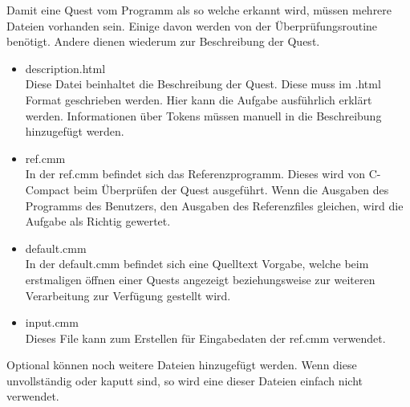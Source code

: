 Damit eine Quest vom Programm als so welche erkannt wird, müssen mehrere Dateien vorhanden sein. Einige davon werden von der Überprüfungsroutine benötigt. Andere dienen wiederum zur Beschreibung der Quest.

\begin{itemize}
\item description.html\\
Diese Datei beinhaltet die Beschreibung der Quest. Diese muss im .html Format geschrieben werden. Hier kann die Aufgabe ausführlich erklärt werden. Informationen über Tokens müssen manuell in die Beschreibung hinzugefügt werden.

\item ref.cmm\\
In der ref.cmm befindet sich das Referenzprogramm. Dieses wird von C-Compact beim Überprüfen der Quest ausgeführt. Wenn die Ausgaben des Programms des Benutzers, den Ausgaben des Referenzfiles gleichen, wird die Aufgabe als Richtig gewertet.

\item default.cmm\\
In der default.cmm befindet sich eine Quelltext Vorgabe, welche beim erstmaligen öffnen einer Quests angezeigt beziehungsweise zur weiteren Verarbeitung zur Verfügung gestellt wird.

\item input.cmm\\
Dieses File kann zum Erstellen für Eingabedaten der ref.cmm verwendet.
\end{itemize}

Optional können noch weitere Dateien hinzugefügt werden. Wenn diese unvollständig oder kaputt sind, so wird eine dieser Dateien einfach nicht verwendet.

